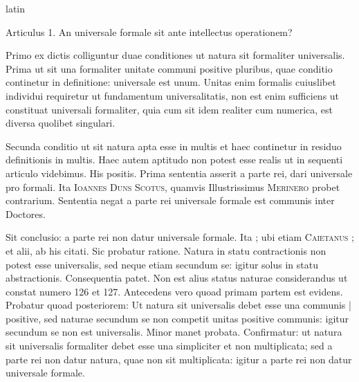 \begin{otherlanguage*}{latin}
\pstart
{}
\pend

\pstart
{}
\pend

\pstart
\noindent%
Articulus 1. An universale formale sit ante intellectus operationem? 
\pend

\pstart
Primo ex dictis colliguntur duae conditiones ut natura sit formaliter universalis. Prima ut sit una formaliter unitate communi positive pluribus, quae conditio continetur in definitione:
universale est unum. Unitas enim formalis cuiuslibet individui requiretur ut fundamentum universalitatis, non est enim sufficiens ut constituat universali formaliter, quia cum sit idem realiter cum numerica, est diversa quolibet singulari. 
\pend

\pstart
Secunda conditio ut sit natura apta esse in multis et haec continetur in residuo definitionis in multis. Haec autem aptitudo non potest esse realis ut in sequenti articulo videbimus. His positis. Prima sententia asserit a parte rei, dari universale pro formali. Ita \textsc{Ioannes Duns Scotus}, quamvis Illustrissimus \textsc{Merinero}\index[persons]{} probet contrarium. Sententia negat a parte rei universale formale est communis inter Doctores. 
\pend

\pstart
Sit conclusio:
a parte rei non datur universale formale. Ita ; ubi etiam \textsc{Caietanus} ;  et alii, ab his citati. Sic probatur ratione. Natura in statu contractionis non potest esse universalis, sed neque etiam secundum se:
igitur solus in statu abstractionis. Consequentia patet. Non est alius status naturae considerandus ut constat numero 126 et 127. Antecedens vero quoad primam partem est evidens. Probatur quoad posteriorem:
Ut natura sit universalis debet esse una communis \textnormal{|} positive, sed naturae secundum se non competit unitas positive communis:
igitur secundum se non est universalis. Minor manet probata. Confirmatur:
ut natura sit universalis formaliter debet esse una simpliciter et non multiplicata; sed a parte rei non datur natura, quae non sit multiplicata:
igitur a parte rei non datur universale formale. 
\pend


\end{otherlanguage*}
